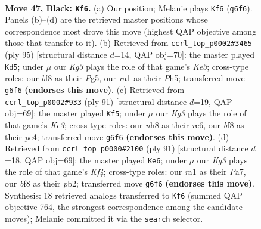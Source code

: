 \documentclass[11pt]{article}
\begin{document}
\clearpage

\begin{figure}[p]\centering
\begin{subfigure}{0.46\textwidth}\centering
\resizebox{\linewidth}{!}{%
\newchessgame
\chessboard[
  setfen={5B1N/p7/P5k1/1P3p2/5b2/3K4/8/R7 b - - 1 47},
  showmover=false,
  pgfstyle=straightmove, color=movearrow, markmove={g6-f6}
]}
\caption{}
\end{subfigure}\hfill
\begin{subfigure}{0.46\textwidth}\centering
\resizebox{\linewidth}{!}{%
\newchessgame
\chessboard[
  setfen={3N4/8/4k3/2b2ppp/P7/7P/4K1P1/8 b - - 7 48},
  showmover=false,
  pgfstyle=straightmove, color=movearrow, markmove={e6-d5}
]}
\caption{}
\end{subfigure}
\\[4pt]
\begin{subfigure}{0.46\textwidth}\centering
\resizebox{\linewidth}{!}{%
\newchessgame
\chessboard[
  setfen={8/8/2R1k1p1/p3p2p/2P5/2K2P2/5b2/8 b - - 4 46},
  showmover=false,
  pgfstyle=straightmove, color=movearrow, markmove={e6-f5}
]}
\caption{}
\end{subfigure}\hfill
\begin{subfigure}{0.46\textwidth}\centering
\resizebox{\linewidth}{!}{%
\newchessgame
\chessboard[
  setfen={b7/p7/8/5kpp/3K4/4N1P1/1P5P/8 b - - 3 46},
  showmover=false,
  pgfstyle=straightmove, color=movearrow, markmove={f5-e6}
]}
\caption{}
\end{subfigure}
\caption{\textbf{Move 47, Black: \texttt{Kf6}.} (a) Our position; Melanie plays \texttt{Kf6} (\texttt{g6f6}). Panels (b)--(d) are the retrieved master positions whose correspondence most drove this move (highest QAP objective among those that transfer to it). (b) Retrieved from \texttt{ccrl\_top\_p0002\#3465} (ply 95) [structural distance $d$=14, QAP obj=70]: the master played \texttt{Kd5}; under $\mu$ our \emph{Kg3} plays the role of that game's \emph{Ke3}; cross-type roles: our \emph{b}f8 as their \emph{P}g5, our \emph{r}a1 as their \emph{P}h5; transferred move \texttt{g6f6} \textbf{(endorses this move)}. (c) Retrieved from \texttt{ccrl\_top\_p0002\#933} (ply 91) [structural distance $d$=19, QAP obj=69]: the master played \texttt{Kf5}; under $\mu$ our \emph{Kg3} plays the role of that game's \emph{Ke3}; cross-type roles: our \emph{n}h8 as their \emph{r}c6, our \emph{b}f8 as their \emph{p}c4; transferred move \texttt{g6f6} \textbf{(endorses this move)}. (d) Retrieved from \texttt{ccrl\_top\_p0000\#2100} (ply 91) [structural distance $d$=18, QAP obj=69]: the master played \texttt{Ke6}; under $\mu$ our \emph{Kg3} plays the role of that game's \emph{Kf4}; cross-type roles: our \emph{r}a1 as their \emph{P}a7, our \emph{b}f8 as their \emph{p}b2; transferred move \texttt{g6f6} \textbf{(endorses this move)}. Synthesis: 18 retrieved analogs transferred to \texttt{Kf6} (summed QAP objective 764, the strongest correspondence among the candidate moves); Melanie committed it via the \texttt{search} selector.}
\label{fig:thought-m93}
\end{figure}
\end{document}
